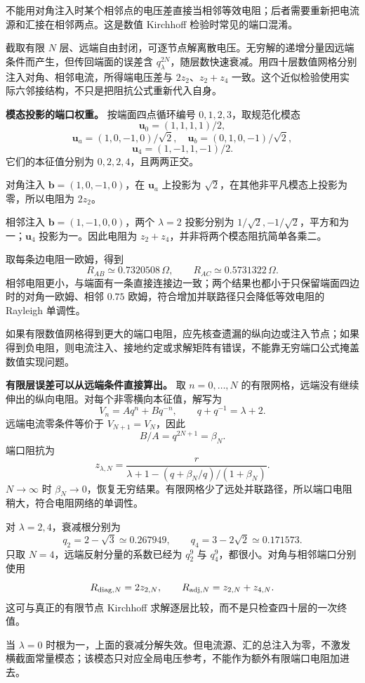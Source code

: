 \documentclass[12pt,a4paper,UTF8]{ctexart}
\begin{document}
不能用对角注入时某个相邻点的电压差直接当相邻等效电阻；后者需要重新把电流源和汇接在相邻两点。这是数值
Kirchhoff 检验时常见的端口混淆。

截取有限 \(N\)
层、远端自由封闭，可逐节点解离散电压。无穷解的递增分量因远端条件而产生，但传回端面的误差含
\(q_\lambda^{2N}\)，随层数快速衰减。用四十层数值网格分别注入对角、相邻电流，所得端电压差与
\(2z_2\)、\(z_2+z_4\)
一致。这个近似检验使用实际六邻接结构，不只是把阻抗公式重新代入自身。

\textbf{模态投影的端口权重。} 按端面四点循环编号
\(0,1,2,3\)，取规范化模态 \[
\bm u_0=(1,1,1,1)/2,
\] \[
\bm u_a=(1,0,-1,0)/\sqrt2,\quad
\bm u_b=(0,1,0,-1)/\sqrt2,
\] \[
\bm u_4=(1,-1,1,-1)/2.
\] 它们的本征值分别为 \(0,2,2,4\)，且两两正交。

对角注入 \(\bm b=(1,0,-1,0)\)，在 \(\bm u_a\) 上投影为
\(\sqrt2\)，在其他非平凡模态上投影为零，所以电阻为 \(2z_2\)。

相邻注入 \(\bm b=(1,-1,0,0)\)，两个 \(\lambda=2\) 投影分别为
\(1/\sqrt2,-1/\sqrt2\)，平方和为一；\(\bm u_4\) 投影为一。因此电阻为
\(z_2+z_4\)，并非将两个模态阻抗简单各乘二。

取每条边电阻一欧姆，得到 \[
R_{AB}\simeq0.7320508\,\Omega,
\qquad R_{AC}\simeq0.5731322\,\Omega.
\]
相邻电阻更小，与端面有一条直接连接边一致；两个结果也都小于只保留端面四边时的对角一欧姆、相邻
\(0.75\) 欧姆，符合增加并联路径只会降低等效电阻的 Rayleigh 单调性。

如果有限数值网格得到更大的端口电阻，应先核查遗漏的纵向边或注入节点；如果得到负电阻，则电流注入、接地约定或求解矩阵有错误，不能靠无穷端口公式掩盖数值实现问题。

\textbf{有限层误差可以从远端条件直接算出。} 取 \(n=0,\ldots,N\)
的有限网格，远端没有继续伸出的纵向电阻。对每个非零横向本征值，解写为 \[
V_n=Aq^n+Bq^{-n},\qquad q+q^{-1}=\lambda+2.
\] 远端电流零条件等价于 \(V_{N+1}=V_N\)，因此 \[
B/A=q^{2N+1}=\beta_N.
\] 端口阻抗为 \[
z_{\lambda,N}=\frac{r}{\lambda+1-(q+\beta_N/q)/(1+\beta_N)}.
\] \(N\to\infty\) 时
\(\beta_N\to0\)，恢复无穷结果。有限网格少了远处并联路径，所以端口电阻稍大，符合电阻网络的单调性。

对 \(\lambda=2,4\)，衰减根分别为 \[
q_2=2-\sqrt3\simeq0.267949,
\qquad q_4=3-2\sqrt2\simeq0.171573.
\] 只取 \(N=4\)，远端反射分量的系数已经为 \(q_2^9\) 与
\(q_4^9\)，都很小。对角与相邻端口分别使用 \[
R_{{\rm diag},N}=2z_{2,N},
\qquad R_{{\rm adj},N}=z_{2,N}+z_{4,N}.
\] 这可与真正的有限节点 Kirchhoff
求解逐层比较，而不是只检查四十层的一次终值。

当 \(\lambda=0\)
时根为一，上面的衰减分解失效。但电流源、汇的总注入为零，不激发横截面常量模态；该模态只对应全局电压参考，不能作为额外有限端口电阻加进去。
\end{document}
